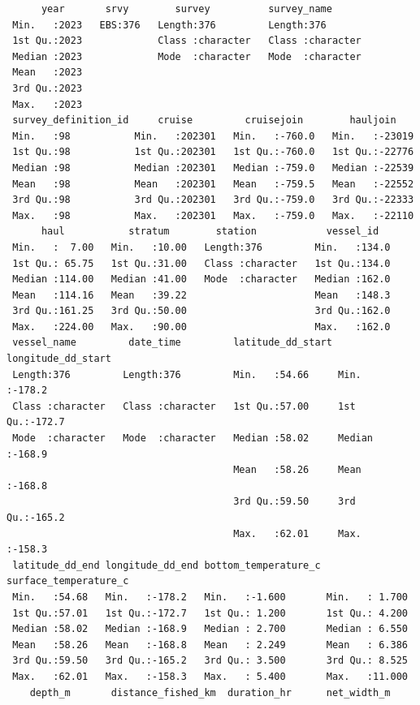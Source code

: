 \documentclass[
  letterpaper,
  oneside,
  open=any]{scrbook}
\begin{document}
\begin{verbatim}
      year       srvy        survey          survey_name       
 Min.   :2023   EBS:376   Length:376         Length:376        
 1st Qu.:2023             Class :character   Class :character  
 Median :2023             Mode  :character   Mode  :character  
 Mean   :2023                                                  
 3rd Qu.:2023                                                  
 Max.   :2023                                                  
 survey_definition_id     cruise         cruisejoin        hauljoin     
 Min.   :98           Min.   :202301   Min.   :-760.0   Min.   :-23019  
 1st Qu.:98           1st Qu.:202301   1st Qu.:-760.0   1st Qu.:-22776  
 Median :98           Median :202301   Median :-759.0   Median :-22539  
 Mean   :98           Mean   :202301   Mean   :-759.5   Mean   :-22552  
 3rd Qu.:98           3rd Qu.:202301   3rd Qu.:-759.0   3rd Qu.:-22333  
 Max.   :98           Max.   :202301   Max.   :-759.0   Max.   :-22110  
      haul           stratum        station            vessel_id    
 Min.   :  7.00   Min.   :10.00   Length:376         Min.   :134.0  
 1st Qu.: 65.75   1st Qu.:31.00   Class :character   1st Qu.:134.0  
 Median :114.00   Median :41.00   Mode  :character   Median :162.0  
 Mean   :114.16   Mean   :39.22                      Mean   :148.3  
 3rd Qu.:161.25   3rd Qu.:50.00                      3rd Qu.:162.0  
 Max.   :224.00   Max.   :90.00                      Max.   :162.0  
 vessel_name         date_time         latitude_dd_start longitude_dd_start
 Length:376         Length:376         Min.   :54.66     Min.   :-178.2    
 Class :character   Class :character   1st Qu.:57.00     1st Qu.:-172.7    
 Mode  :character   Mode  :character   Median :58.02     Median :-168.9    
                                       Mean   :58.26     Mean   :-168.8    
                                       3rd Qu.:59.50     3rd Qu.:-165.2    
                                       Max.   :62.01     Max.   :-158.3    
 latitude_dd_end longitude_dd_end bottom_temperature_c surface_temperature_c
 Min.   :54.68   Min.   :-178.2   Min.   :-1.600       Min.   : 1.700       
 1st Qu.:57.01   1st Qu.:-172.7   1st Qu.: 1.200       1st Qu.: 4.200       
 Median :58.02   Median :-168.9   Median : 2.700       Median : 6.550       
 Mean   :58.26   Mean   :-168.8   Mean   : 2.249       Mean   : 6.386       
 3rd Qu.:59.50   3rd Qu.:-165.2   3rd Qu.: 3.500       3rd Qu.: 8.525       
 Max.   :62.01   Max.   :-158.3   Max.   : 5.400       Max.   :11.000       
    depth_m       distance_fished_km  duration_hr      net_width_m   

\end{verbatim}
\end{document}
